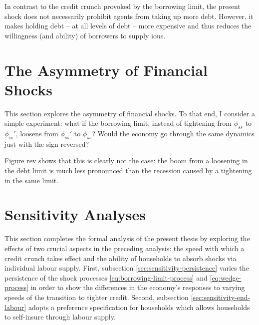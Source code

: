 \documentclass[12pt]{article} %
\numberwithin{equation}{section} %
\numberwithin{figure}{section}
\numberwithin{table}{section}
\begin{document}
In contrast to the credit crunch provoked by the borrowing limit, the present shock does not necessarily prohibit agents from taking up more debt. However, it makes holding debt -- at all levels of debt -- more expensive and thus reduces the willingness (and ability) of borrowers to supply \Gls{iou}s.


\section{The Asymmetry of Financial Shocks}
\label{sec:asymmetry}

This section explores the asymmetry of financial shocks. To that end, I consider a simple experiment: what if the borrowing limit, instead of tightening from $\phi_{ss}$ to $\phi_{ss}'$, loosens from $\phi_{ss}'$ to $\phi_{ss}$? Would the economy go through the same dynamics just with the sign reversed?

Figure rev shows that this is clearly not the case: the boom from a loosening in the debt limit is much less pronounced than the recession caused by a tightening in the same limit.

\section{Sensitivity Analyses}
\label{sec:sensitivity}

This section completes the formal analysis of the present thesis by exploring the effects of two crucial aspects in the preceding analysis: the speed with which a credit crunch takes effect and the ability of households to absorb shocks via individual labour supply. First, subsection \ref{sec:sensitivity-persistence} varies the persistence of the shock processes \eqref{eq:borrowing-limit-process} and \eqref{eq:wedge-process} in order to show the differences in the economy's responses to varying speeds of the transition to tighter credit. Second, subsection \ref{sec:sensitivity-end-labour} adopts a preference specification for households which allows households to self-insure through labour supply.
\end{document}

